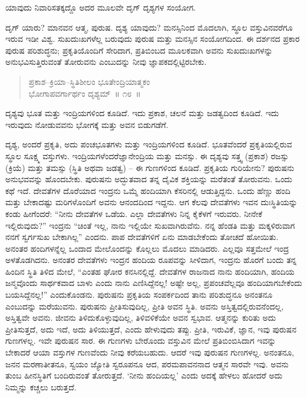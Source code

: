 
ಯಾವುದು ನಿವಾರಿಸತಕ್ಕದ್ದೊ ಅದರ ಮೂಲವೇ ದೃಗ್​ ದೃಶ್ಯಗಳ ಸಂಯೋಗ. 

ದೃಗ್​ ಯಾರು? ಮಾನವನ ಆತ್ಮ, ಪುರುಷ. ದೃಶ್ಯ ಯಾವುದು? ಮನಸ್ಸಿನಿಂದ ಮೊದಲಾಗಿ, ಸ್ಥೂಲ ವಸ್ತುವಿನವರೆಗೂ ಇರುವ ಇಡೀ ವಿಶ್ವ. ಸುಖದುಃಖಗಳೆಲ್ಲ ಬರುವುದು ಪುರುಷ ಮತ್ತು ಮನಸ್ಸಿನ ಸಂಯೋಗದಿಂದ. ಈ ದರ್ಶನದ ಪ್ರಕಾರ ಪುರುಷ ಪರಿಶುದ್ಧನು; ಪ್ರಕೃತಿಯೊಂದಿಗೆ ಸೇರಿದಾಗ, ಪ್ರತಿಬಿಂಬದ ಮೂಲಕವಾಗಿ ಅವನು ಸುಖದುಃಖಗಳನ್ನು ಅನುಭವಿಸುತ್ತಿರುವಂತೆ ತೋರುವನು ಎಂಬುದನ್ನು ನೀವು ಜ್ಞಾಪಕದಲ್ಲಿಟ್ಟಿರಬೇಕು. 


\begin{verse}
ಪ್ರಕಾಶ–ಕ್ರಿಯಾ–ಸ್ಥಿತಿಶೀಲಂ ಭೂತೇಂದ್ರಿಯಾತ್ಮಕಂ\\ ಭೋಗಾಪವರ್ಗಾರ್ಥಂ ದೃಶ್ಯಮ್​~॥ ೧೮~॥
\end{verse}


ದೃಶ್ಯವು ಭೂತ ಮತ್ತು ಇಂದ್ರಿಯಗಳಿಂದ ಕೂಡಿದೆ. ಇದು ಪ್ರಕಾಶ, ಚಲನೆ ಮತ್ತು ಜಡತ್ವದಿಂದ ಕೂಡಿದೆ. ಇದು ಇರುವುದು ನೋಡುವವನು ಭೋಗಕ್ಕೆ ಮತ್ತು ಅವನ ಬಿಡು\break ಗಡೆಗೆ. 

ದೃಶ್ಯ, ಅಂದರೆ ಪ್ರಕೃತಿ, ಅದು ಪಂಚಭೂತಗಳು ಮತ್ತು ಇಂದ್ರಿಯಗಳಿಂದ ಕೂಡಿದೆ. ಭೂತವೆಂದರೆ ಪ್ರಕೃತಿಯಲ್ಲಿರುವ ಸ್ಥೂಲ ಸೂಕ್ಷ್ಮ ವಸ್ತುಗಳು. ಇಂದ್ರಿಯಗಳೆಂದರೆ\break ಜ್ಞಾನೇಂದ್ರಿಯ ಮತ್ತು ಮನಸ್ಸು. ಈ ದೃಶ್ಯವು ಸತ್ತ್ವ (ಪ್ರಕಾಶ) ರಜಸ್ಸು (ಕ್ರಿಯೆ) ಮತ್ತು ತಮಸ್ಸು (ಸ್ಥಿತಿ ಅಥವಾ ಜಡತ್ವ) – ಈ ಗುಣಗಳಿಂದ ಕೂಡಿದೆ. ಪ್ರಕೃತಿಯ ಗುರಿಯೇನು? ಪುರುಷನು ಅನುಭವವನ್ನು ಹೊಂದಬೇಕು. ಪುರುಷನು ಅದ್ಭುತವಾದ ತನ್ನ ದೈವಿಕ ಶಕ್ತಿಯನ್ನು ಮರೆತಂತೆ ತೋರುವನು. ಒಂದು ಕಥೆ ಇದೆ. ದೇವತೆಗಳ ದೊರೆಯಾದ ಇಂದ್ರನು ಒಮ್ಮೆ ಹಂದಿಯಾಗಿ ಕೆಸರಿನಲ್ಲಿ ಆಡುತ್ತಿದ್ದನು. ಒಂದು ಹೆಣ್ಣು ಹಂದಿ ಮತ್ತು ಬೇಕಾದಷ್ಟು ಮರಿಗಳೊಂದಿಗೆ ಅವನು ಆನಂದದಿಂದ ಇದ್ದನು. ಆಗ ಕೆಲವು ದೇವತೆಗಳು ಇವನ ದುಃಸ್ಥಿತಿಯನ್ನು ಕಂಡು ಹೀಗೆಂದರೆ: “ನೀನು ದೇವತೆಗಳ ಒಡೆಯ. ಎಲ್ಲಾ ದೇವತೆಗಳು ನಿನ್ನ ಕೈಕೆಳಗೆ ಇರುವರು. ನೀನೇಕೆ ಇಲ್ಲಿರುವುದು?” ಇಂದ್ರನು “ಚಿಂತೆ ಇಲ್ಲ, ನಾನು ಇಲ್ಲಿಯೇ ಸುಖ\break ವಾಗಿರುವೆನು. ನನ್ನ ಹೆಂಡತಿ ಮತ್ತು ಮಕ್ಕಳಿರುವಾಗ ನನಗೆ ಸ್ವರ್ಗಸುಖ ಬೇಕಾಗಿಲ್ಲ” ಎಂದನು. ಪಾಪ ದೇವತೆಗಳಿಗೆ ಏನು ಮಾಡಬೇಕೆಂದು ತೋಚದೆ ಹೋಯಿತು. ಅನಂತರ ಹಂದಿಗಳನ್ನೆಲ್ಲ ಒಂದಾದ ಮೇಲೊಂದನ್ನು ಕೊಲ್ಲಲು ಮೊದಲು ಮಾಡಿದರು. ಎಲ್ಲವೂ ಸತ್ತಮೇಲೆ ಇಂದ್ರ ಅಳತೊಡಗಿದನು. ಅನಂತರ ದೇವತೆಗಳು ಇಂದ್ರನ ಹಂದಿಯ ರೂಪವನ್ನು ಸೀಳಿದಾಗ, ಇಂದ್ರನು ಹೊರಗೆ ಬಂದು ತನ್ನ ಹಿಂದಿನ ಸ್ಥಿತಿ ತಿಳಿದ ಮೇಲೆ, “ಎಂತಹ ಘೋರ ಕನಸಿನಲ್ಲಿದ್ದೆ. ದೇವತೆಗಳ ರಾಜನಾದ ನಾನು ಹಂದಿಯಾಗಿ, ಹಂದಿಯ ಜನ್ಮವೊಂದು ಸಾರ್ಥಕವಾದ ಬಾಳು ಎಂದು ನಾನು ಎಣಿಸಿದ್ದೆನಲ್ಲ! ಅಷ್ಟೇ ಅಲ್ಲ, ಪ್ರಪಂಚವೆಲ್ಲವೂ ಹಂದಿಯಾಗಬೇಕೆಂದು ಬಯಸಿದ್ದೆನಲ್ಲ!” ಎಂದುಕೊಂಡನು. ಪುರುಷನು ಪ್ರಕೃತಿಯ ಸಂಪರ್ಕದಿಂದ ತಾನು ಪರಿಶುದ್ಧನೂ ಅನಂತನೂ ಎಂಬುದನ್ನು ಮರೆಯುವನು. ಪುರುಷನು ಪ್ರೀತಿಸುವುದಿಲ್ಲ, ಪ್ರೀತಿ ಅವನ ಸ್ಥಿತಿ. ಅವನು ಅಸ್ತಿತ್ವದಲ್ಲಿರುವನೆಂದಲ್ಲ, ಅಸ್ತಿತ್ವವೇ ಅವನು. ಜೀವನು ತಿಳಿದುಕೊಳ್ಳುವುದಿಲ್ಲ, ತಿಳಿವಳಿಕೆಯೇ ಅವನ ಸ್ವಭಾವ. ಆತ್ಮನನ್ನು ಕುರಿತು ಅದು ಪ್ರೀತಿಸುತ್ತದೆ, ಅದು ಇದೆ, ಅದು ತಿಳಿಯುತ್ತದೆ, ಎಂದು ಹೇಳುವುದು ತಪ್ಪು. ಪ್ರೀತಿ, ಇರುವಿಕೆ, ಜ್ಞಾನ, ಇವು ಪುರುಷನ ಗುಣಗಳಲ್ಲ. ಇವೇ ಪುರುಷನ ಸಾರ. ಈ ಗುಣಗಳು ಬೇರೊಂದು ವಸ್ತುವಿನ ಮೇಲೆ ಪ್ರತಿಬಿಂಬಿಸಿದಾಗ ಇವನ್ನು ಬೇಕಾದರೆ ಆಯಾ ವಸ್ತುಗಳ ಗುಣವೆಂದು ನೀವು ಕರೆಯಬಹುದು. ಆದರೆ ಇವು ಪುರುಷನ ಗುಣಗಳಲ್ಲ. ಅನಂತನೂ, ಜನನ ಮರಣಾತೀತನೂ, ಸ್ವಯಂ ಜ್ಯೋತಿ ಸ್ವರೂಪನೂ ಆದ, ಪರಮಪಾವನನಾದ ಆತ್ಮನ ಸಾರವೇ ಇವು. ಅವನು ತುಂಬ ಹೀನಸ್ಥಿತಿಗೆ ಬಂದಿರುವಂತೆ ತೋರುತ್ತದೆ. ‘ನೀನು ಹಂದಿಯಲ್ಲ’ ಎಂದು ಅದಕ್ಕೆ ಹೇಳಲು ಹೋದರೆ ಅದು ನಿಮ್ಮನ್ನು ಕಚ್ಚಲು ಬರುತ್ತದೆ. 

